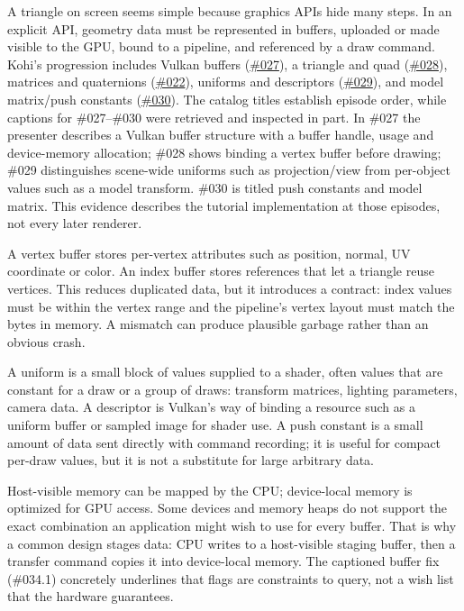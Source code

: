 A triangle on screen seems simple because graphics APIs hide many steps. In an explicit API, geometry data must be represented in buffers, uploaded or made visible to the GPU, bound to a pipeline, and referenced by a draw command. Kohi's progression includes Vulkan buffers (\href{https://www.youtube.com/watch?v=jHSYJXs7VJQ}{\#027}), a triangle and quad (\href{https://www.youtube.com/watch?v=kgnc_hHVz_M}{\#028}), matrices and quaternions (\href{https://www.youtube.com/watch?v=nk3KNPrSRqc}{\#022}), uniforms and descriptors (\href{https://www.youtube.com/watch?v=yc40ixalLtU}{\#029}), and model matrix/push constants (\href{https://www.youtube.com/watch?v=xGonaV-OB7E}{\#030}). The catalog titles establish episode order, while captions for \#027--\#030 were retrieved and inspected in part. In \#027 the presenter describes a Vulkan buffer structure with a buffer handle, usage and device-memory allocation; \#028 shows binding a vertex buffer before drawing; \#029 distinguishes scene-wide uniforms such as projection/view from per-object values such as a model transform. \#030 is titled push constants and model matrix. This evidence describes the tutorial implementation at those episodes, not every later renderer.

A vertex buffer stores per-vertex attributes such as position, normal, UV coordinate or color. An index buffer stores references that let a triangle reuse vertices. This reduces duplicated data, but it introduces a contract: index values must be within the vertex range and the pipeline's vertex layout must match the bytes in memory. A mismatch can produce plausible garbage rather than an obvious crash.

A uniform is a small block of values supplied to a shader, often values that are constant for a draw or a group of draws: transform matrices, lighting parameters, camera data. A descriptor is Vulkan's way of binding a resource such as a uniform buffer or sampled image for shader use. A push constant is a small amount of data sent directly with command recording; it is useful for compact per-draw values, but it is not a substitute for large arbitrary data.

Host-visible memory can be mapped by the CPU; device-local memory is optimized for GPU access. Some devices and memory heaps do not support the exact combination an application might wish to use for every buffer. That is why a common design stages data: CPU writes to a host-visible staging buffer, then a transfer command copies it into device-local memory. The captioned buffer fix (\#034.1) concretely underlines that flags are constraints to query, not a wish list that the hardware guarantees.


